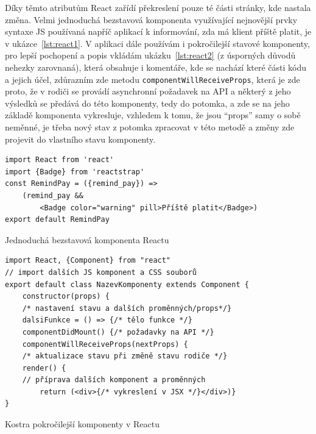     Díky těmto atributům React zařídí překreslení pouze té části stránky, kde nastala změna. Velmi jednoduchá bezstavová komponenta využívající nejnovější prvky syntaxe JS používaná napříč aplikací k informování, zda má klient příště platit, je v ukázce~\ref{lst:react1}. V aplikaci dále používám i pokročilejší stavové komponenty, pro lepší pochopení a popis vkládám ukázku~\ref{lst:react2} (z úsporných důvodů nehezky zarovnaná), která obsahuje i komentáře, kde se nachází které části kódu a jejich účel, zdůrazním zde metodu \verb|componentWillReceiveProps|, která je zde proto, že v rodiči se provádí asynchronní požadavek na API a některý z jeho výsledků se předává do této komponenty, tedy do potomka, a zde se na jeho základě komponenta vykresluje, vzhledem k tomu, že jsou \enquote{props} samy o sobě neměnné, je třeba nový stav z potomka zpracovat v této metodě a změny zde projevit do vlastního stavu komponenty. 
    
    \begin{listing}
    	\begin{verbatim}
import React from 'react'
import {Badge} from 'reactstrap'
const RemindPay = ({remind_pay}) =>
    (remind_pay && 
        <Badge color="warning" pill>Příště platit</Badge>)
export default RemindPay
    	\end{verbatim}
    	\caption{Jednoduchá bezstavová komponenta Reactu}\label{lst:react1}
    \end{listing}
    
    \begin{listing}[ht]
    	\begin{verbatim}
import React, {Component} from "react"
// import dalších JS komponent a CSS souborů
export default class NazevKomponenty extends Component {
    constructor(props) {
    /* nastavení stavu a dalších proměnných/props*/}
    dalsiFunkce = () => {/* tělo funkce */}
    componentDidMount() {/* požadavky na API */}
    componentWillReceiveProps(nextProps) {
    /* aktualizace stavu při změně stavu rodiče */}
    render() {
    // příprava dalších komponent a proměnných
        return (<div>{/* vykreslení v JSX */}</div>)}
}
    	\end{verbatim}
    	\caption{Kostra pokročilejší komponenty v Reactu}\label{lst:react2}
    \end{listing}
    
